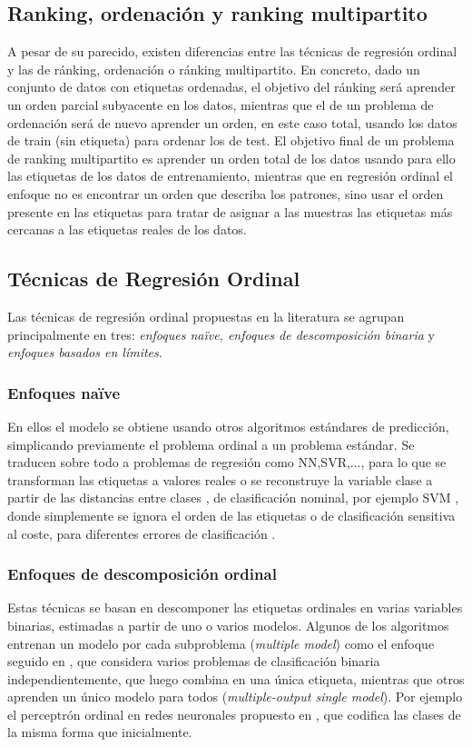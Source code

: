 \subsection{Ranking, ordenación y ranking multipartito}
A pesar de su parecido, existen diferencias entre las técnicas de regresión ordinal y las de ránking, ordenación o ránking multipartito. En concreto, dado un conjunto de datos con etiquetas ordenadas, el objetivo del ránking será aprender un orden parcial subyacente en los datos, mientras que el de un problema de ordenación será de nuevo aprender un orden, en este caso total, usando los datos de train (sin etiqueta) para ordenar los de test. El objetivo final de un problema de ranking multipartito es aprender un orden total de los datos usando para ello las etiquetas de los datos de entrenamiento, mientras que en regresión ordinal el enfoque no es encontrar un orden que describa los patrones, sino usar el orden presente en las etiquetas para tratar de asignar a las muestras las etiquetas más cercanas a las etiquetas reales de los datos. 

\subsection{Técnicas de Regresión Ordinal}
Las técnicas de regresión ordinal propuestas en la literatura se agrupan principalmente en tres: \textit{enfoques naïve, enfoques de descomposición binaria} y \textit{enfoques basados en límites}. 
\subsubsection{Enfoques naïve}
En ellos el modelo se obtiene usando otros algoritmos estándares de predicción, simplicando previamente el problema ordinal a un problema estándar. Se traducen sobre todo a problemas de regresión como NN,SVR,..., para lo que se transforman las etiquetas a valores reales \cite{Torra2006} o se reconstruye la variable clase a partir de las distancias entre clases \cite{Sanchez2013}, de clasificación nominal, por ejemplo SVM \cite{Vapnik2015}, donde simplemente se ignora el orden de las etiquetas o de clasificación sensitiva al coste, para diferentes errores de clasificación \cite{unknown}.  
\subsubsection{Enfoques de descomposición ordinal}
Estas técnicas se basan en descomponer las etiquetas ordinales en varias variables binarias, estimadas a partir de uno o varios modelos. Algunos de los algoritmos entrenan un modelo por cada subproblema (\textit{multiple model}) como el enfoque seguido en \cite{Hall}, que considera varios problemas de clasificación binaria independientemente, que luego combina en una única etiqueta, mientras que otros aprenden un único modelo para todos (\textit{multiple-output single model}). Por ejemplo el perceptrón ordinal en redes neuronales propuesto en \cite{cheng2008neural}, que codifica las clases de la misma forma que \cite{Hall} inicialmente.
